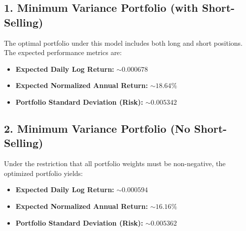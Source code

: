 \documentclass[12pt]{article}
\begin{document}
\subsection*{1. Minimum Variance Portfolio (with Short-Selling)}
The optimal portfolio under this model includes both long and short positions. The expected performance metrics are:
\begin{itemize}
    \item \textbf{Expected Daily Log Return:} $\sim 0.000678$
    \item \textbf{Expected Normalized Annual Return:} $\sim 18.64\%$
    \item \textbf{Portfolio Standard Deviation (Risk):} $\sim 0.005342$
\end{itemize}

\subsection*{2.  Minimum Variance Portfolio (No Short-Selling)}
Under the restriction that all portfolio weights must be non-negative, the optimized portfolio yields:
\begin{itemize}
    \item \textbf{Expected Daily Log Return:} $\sim 0.000594 $
    \item \textbf{Expected Normalized Annual Return:} $\sim 16.16\%$
    \item \textbf{Portfolio Standard Deviation (Risk):} $\sim 0.005362$
\end{itemize}
\end{document}
